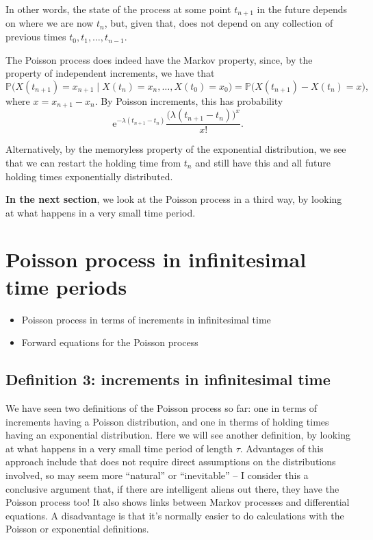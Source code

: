 \documentclass[
  a4paper,
]{article}
\providecommand{\tightlist}{%
  \setlength{\itemsep}{0pt}\setlength{\parskip}{0pt}}
\theoremstyle{definition}
\theoremstyle{definition}
\theoremstyle{definition}
\theoremstyle{remark}
\begin{document}
In other words, the state of the process at some point \(t_{n+1}\) in the future depends on where we are now \(t_n\), but, given that, does not depend on any collection of previous times \(t_0, t_1, \dots, t_{n-1}\).

The Poisson process does indeed have the Markov property, since, by the property of independent increments, we have that
\[ \mathbb P\big( X(t_{n+1}) = x_{n+1} \mid X(t_n) = x_n, \dots, X(t_0) = x_0 \big) = \mathbb P\big( X(t_{n+1}) -X(t_n) = x\big) , \]
where \(x = x_{n+1}-x_n\). By Poisson increments, this has probability
\[ \mathrm{e}^{-\lambda(t_{n+1}-t_n)} \frac{\big(\lambda(t_{n+1}-t_n)\big)^x}{x!} . \]

Alternatively, by the memoryless property of the exponential distribution, we see that we can restart the holding time from \(t_n\) and still have this and all future holding times exponentially distributed.

\textbf{In the next section}, we look at the Poisson process in a third way, by looking at what happens in a very small time period.

\hypertarget{S15-poisson-exponential}{%
\section{Poisson process in infinitesimal time periods}\label{S15-poisson-exponential}}

\begin{itemize}
\tightlist
\item
  Poisson process in terms of increments in infinitesimal time
\item
  Forward equations for the Poisson process
\end{itemize}

\hypertarget{infinitesimal}{%
\subsection{Definition 3: increments in infinitesimal time}\label{infinitesimal}}

We have seen two definitions of the Poisson process so far: one in terms of increments having a Poisson distribution, and one in therms of holding times having an exponential distribution. Here we will see another definition, by looking at what happens in a very small time period of length \(\tau\). Advantages of this approach include that does not require direct assumptions on the distributions involved, so may seem more ``natural'' or ``inevitable'' -- I consider this a conclusive argument that, if there are intelligent aliens out there, they have the Poisson process too! It also shows links between Markov processes and differential equations. A disadvantage is that it's normally easier to do calculations with the Poisson or exponential definitions.
\end{document}
